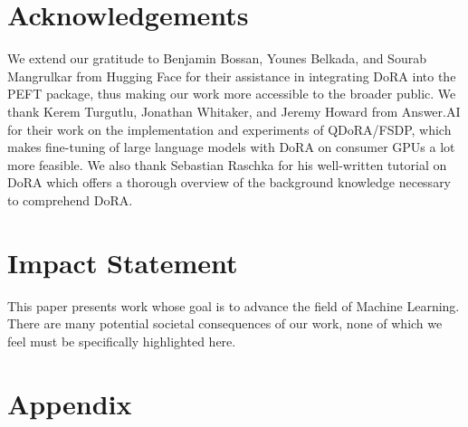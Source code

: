 \documentclass{article}
\theoremstyle{plain}
\theoremstyle{definition}
\theoremstyle{remark}
\begin{document}
\newpage
\section*{Acknowledgements}
We extend our gratitude to Benjamin Bossan, Younes Belkada, and Sourab Mangrulkar from Hugging Face for their assistance in integrating DoRA into the PEFT package, thus making our work more accessible to the broader public. We thank Kerem Turgutlu, Jonathan Whitaker, and Jeremy Howard from Answer.AI for their work on the implementation and experiments of QDoRA/FSDP, which makes fine-tuning of large language models with DoRA on consumer GPUs a lot more feasible. We also thank Sebastian Raschka for his well-written tutorial on DoRA which offers a thorough overview of the background knowledge necessary to comprehend DoRA.

\section*{Impact Statement}
This paper presents work whose goal is to advance the field of Machine Learning. There are many potential societal consequences of our work, none of which we feel must be specifically highlighted here.





\newpage
\appendix
\onecolumn
\section{Appendix}
\end{document}
